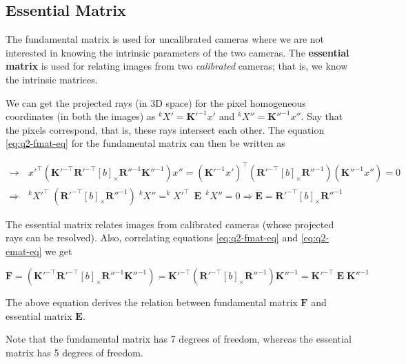 
\subsection{Essential Matrix}

The fundamental matrix is used for uncalibrated cameras where we are not interested in knowing the intrinsic parameters of the two cameras. The \textbf{essential matrix} is used for relating images from two \textit{calibrated} cameras; that is, we know the intrinsic matrices.

We can get the projected rays (in 3D space) for the pixel homogeneous coordinates (in both the images) as $^kX' = \mathbf{K}'^{-1} x'$ and $^kX'' = \mathbf{K}''^{-1} x''$. Say that the pixels correspond, that is, these rays intersect each other. The equation \ref{eq:q2-fmat-eq} for the fundamental matrix can then be written as

\begin{align}
    \rightarrow& \,
    x'^\top \left ( \mathbf{K}'^{-\top} \mathbf{R}'^{-\top} \left [ b \right ]_\times \mathbf{R}''^{-1} \mathbf{K}''^{-1} \right ) x'' = \left ( \mathbf{K}'^{-1}x' \right )^\top  \left ( \mathbf{R}'^{-\top} \left [ b \right ]_\times \mathbf{R}''^{-1} \right ) \left ( \mathbf{K}''^{-1} x'' \right ) = 0
    \nonumber \\
    \Rightarrow& \, ^kX'^\top \; \left ( \mathbf{R}'^{-\top} \left [ b \right ]_\times \mathbf{R}''^{-1} \right ) \; ^kX'' = ^kX'^\top \;\, \mathbf{E} \;\, ^kX'' = 0
    \Rightarrow \mathbf{E} = \mathbf{R}'^{-\top} \left [ b \right ]_\times \mathbf{R}''^{-1}
    \label{eq:q2-emat-eq}
\end{align}

The essential matrix relates images from calibrated cameras (whose projected rays can be resolved). Also, correlating equations \ref{eq:q2-fmat-eq} and \ref{eq:q2-emat-eq} we get

\begin{equation}
    \mathbf{F} = \left ( \mathbf{K}'^{-\top} \mathbf{R}'^{-\top} \left [ b \right ]_\times \mathbf{R}''^{-1} \mathbf{K}''^{-1} \right ) = \mathbf{K}'^{-\top} \left ( \mathbf{R}'^{-\top} \left [ b \right ]_\times \mathbf{R}''^{-1} \right ) \mathbf{K}''^{-1} = \mathbf{K}'^{-\top} \; \mathbf{E} \; \mathbf{K}''^{-1}
\end{equation}

The above equation derives the relation between fundamental matrix $\mathbf{F}$ and essential matrix $\mathbf{E}$.

Note that the fundamental matrix has 7 degrees of freedom, whereas the essential matrix has 5 degrees of freedom.
